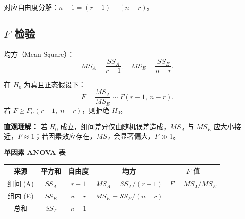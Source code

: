 对应自由度分解：$n-1 = (r-1) + (n-r)$。

\subsection{$F$ 检验}

均方（Mean Square）：
\begin{equation}
    MS_A = \frac{SS_A}{r-1}, \quad MS_E = \frac{SS_E}{n-r}.
\end{equation}

\begin{theorem}[ANOVA $F$ 检验]
在 $H_0$ 为真且正态假设下：
\begin{equation}
    F = \frac{MS_A}{MS_E} \sim F(r-1,\; n-r).
\end{equation}
若 $F \ge F_{\alpha}(r-1,\; n-r)$，则拒绝 $H_0$。
\end{theorem}

\textbf{直观理解：} 若 $H_0$ 成立，组间差异仅由随机误差造成，$MS_A$ 与 $MS_E$ 应大小接近，$F \approx 1$；若因素效应存在，$MS_A$ 会显著偏大，$F \gg 1$。

\begin{center}
\textbf{单因素 ANOVA 表}
\begin{tabular}{c|c|c|c|c}
    \toprule
    来源 & 平方和 & 自由度 & 均方 & $F$ 值 \\
    \midrule
    组间 (A) & $SS_A$ & $r-1$ & $MS_A = SS_A/(r-1)$ & $F = MS_A/MS_E$ \\
    组内 (E) & $SS_E$ & $n-r$ & $MS_E = SS_E/(n-r)$ & \\
    \midrule
    总和    & $SS_T$ & $n-1$ & & \\
    \bottomrule
\end{tabular}
\end{center}

